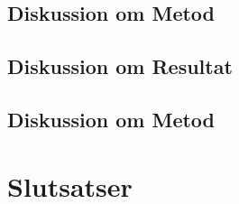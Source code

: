 \subsection{Diskussion om Metod}

\subsection{Diskussion om Resultat}

\subsection{Diskussion om Metod}


\section{Slutsatser}
\label{sec:conclusions-karlsson}


